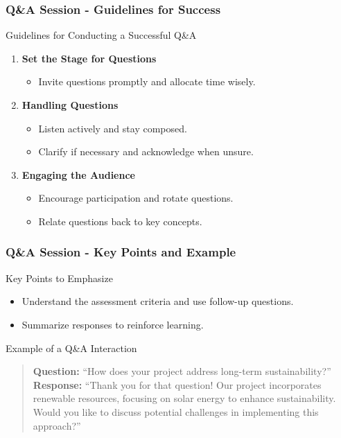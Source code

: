 \documentclass[aspectratio=169]{beamer}
\begin{document}
\begin{frame}[fragile]
    \frametitle{Q\&A Session - Guidelines for Success}
    \begin{block}{Guidelines for Conducting a Successful Q\&A}
        \begin{enumerate}
            \item \textbf{Set the Stage for Questions}
                \begin{itemize}
                    \item Invite questions promptly and allocate time wisely.
                \end{itemize}
            \item \textbf{Handling Questions}
                \begin{itemize}
                    \item Listen actively and stay composed.
                    \item Clarify if necessary and acknowledge when unsure.
                \end{itemize}
            \item \textbf{Engaging the Audience}
                \begin{itemize}
                    \item Encourage participation and rotate questions.
                    \item Relate questions back to key concepts.
                \end{itemize}
        \end{enumerate}
    \end{block}
\end{frame}

\begin{frame}[fragile]
    \frametitle{Q\&A Session - Key Points and Example}
    \begin{block}{Key Points to Emphasize}
        \begin{itemize}
            \item Understand the assessment criteria and use follow-up questions.
            \item Summarize responses to reinforce learning.
        \end{itemize}
    \end{block}

    \begin{block}{Example of a Q\&A Interaction}
        \begin{quote}
            \textbf{Question:} ``How does your project address long-term sustainability?''\\
            \textbf{Response:} ``Thank you for that question! Our project incorporates renewable resources, focusing on solar energy to enhance sustainability. Would you like to discuss potential challenges in implementing this approach?''
        \end{quote}
    \end{block}
\end{frame}
\end{document}
